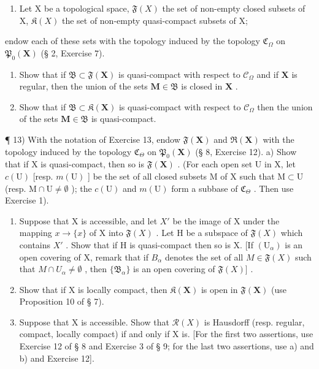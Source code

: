 \begin{enumerate}
\def\labelenumi{\arabic{enumi})}
\setcounter{enumi}{11}
\tightlist
\item
  Let X be a topological space, \(\mathfrak{F}(X)\) the set of non-empty closed subsets of X, \(\mathfrak{K}(X)\) the set of non-empty quasi-compact subsets of X;
\end{enumerate}

endow each of these sets with the topology induced by the topology \(\mathfrak{C}_{\Omega}\) on \(\mathfrak{P}_{0}(\mathbf{X})\) (§ 2, Exercise 7).

\begin{enumerate}
\def\labelenumi{\alph{enumi})}
\tightlist
\item
  Show that if \(\mathfrak{B} \subset \mathfrak{F}(\mathbf{X})\) is quasi-compact with respect to \(\mathcal{C}_{\Omega}\) and if \(\mathbf{X}\) is regular, then the union of the sets \(\mathbf{M} \in \mathfrak{B}\) is closed in \(\mathbf{X}\) .\\
\item
  Show that if \(\mathfrak{B} \subset \mathfrak{K}(\mathbf{X})\) is quasi-compact with respect to \(\mathcal{C}_{\Omega}\) then the union of the sets \(\mathbf{M} \in \mathfrak{B}\) is quasi-compact.
\end{enumerate}

¶ 13) With the notation of Exercise 13, endow \(\mathfrak{F}(\mathbf{X})\) and \(\mathfrak{R}(\mathbf{X})\) with the topology induced by the topology \(\mathfrak{C}_{\Theta}\) on \(\mathfrak{P}_{0}(\mathbf{X})\) (§ 8, Exercise 12). a) Show that if X is quasi-compact, then so is \(\mathfrak{F}(\mathbf{X})\) . (For each open set U in X, let \(c(\mathrm{U})\) {[}resp. \(m(\mathrm{U})\) {]} be the set of all closed subsets M of X such that \(\mathrm{M} \subset \mathrm{U}\) (resp. \(\mathrm{M} \cap \mathrm{U} \neq \emptyset\) ); the \(c(\mathrm{U})\) and \(m(\mathrm{U})\) form a subbase of \(\mathfrak{C}_{\Theta}\) . Then use Exercise 1).

\begin{enumerate}
\def\labelenumi{\alph{enumi})}
\setcounter{enumi}{1}
\item
  Suppose that X is accessible, and let \(X'\) be the image of X under the mapping \(x \to \{x\}\) of X into \(\mathfrak{F}(X)\) . Let H be a subspace of \(\mathfrak{F}(X)\) which contains \(X'\) . Show that if H is quasi-compact then so is X. {[}If \((\mathrm{U}_{\alpha})\) is an open covering of X, remark that if \(B_{\alpha}\) denotes the set of all \(M \in \mathfrak{F}(X)\) such that \(M \cap U_{\alpha} \neq \emptyset\) , then \(\{\mathfrak{B}_{\alpha}\}\) is an open covering of \(\mathfrak{F}(X)]\) .
\item
  Show that if X is locally compact, then \(\mathfrak{K}(\mathbf{X})\) is open in \(\mathfrak{F}(\mathbf{X})\) (use Proposition 10 of § 7).
\item
  Suppose that X is accessible. Show that \(\mathcal{R}(X)\) is Hausdorff (resp. regular, compact, locally compact) if and only if X is. {[}For the first two assertions, use Exercise 12 of § 8 and Exercise 3 of § 9; for the last two assertions, use a) and b) and Exercise 12{]}.
\end{enumerate}

